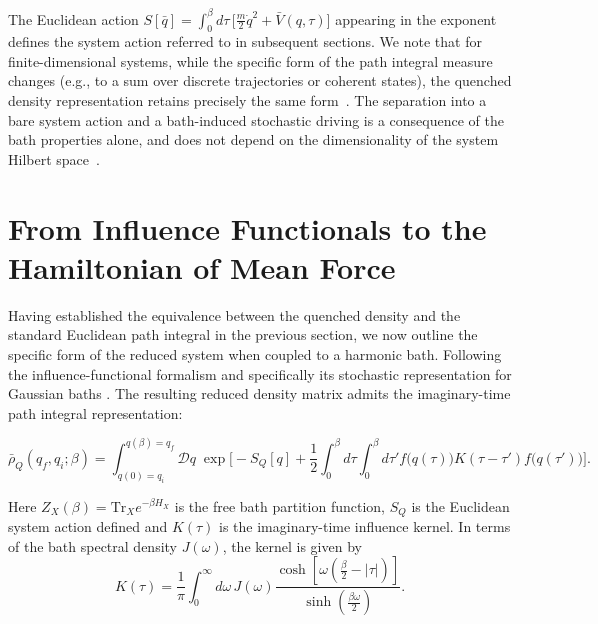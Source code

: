 \documentclass[aps,prl,twocolumn,superscriptaddress,showpacs,floatfix]{revtex4-2}
\newcommand{\Tr}{\mathrm{Tr}}
\begin{document}
The Euclidean action $S[\bar q]=\int_0^\beta d\tau\,\big[\frac{m}{2}\dot q^2+\bar V(q,\tau)\big]$
appearing in the exponent defines the system action referred to in subsequent
sections. We note that for finite-dimensional systems, while the specific form of the path integral measure changes (e.g., to a sum over discrete trajectories or coherent states), the quenched density representation retains precisely the same form~\cite{weissQuantumDissipativeSystems2012, altlandCondensedMatterField2010}. The separation into a bare system action and a bath-induced stochastic driving is a consequence of the bath properties alone, and does not depend on the dimensionality of the system Hilbert space~\cite{leggettDynamicsDissipativeTwostate1987}.
 \section{\label{sec:influence_to_hmf}From Influence Functionals to the Hamiltonian of Mean Force}
Having established the equivalence between the quenched density and the standard Euclidean path integral in the previous section, we now outline the specific form of the reduced system when coupled to a harmonic bath. Following the influence-functional formalism \cite{feynmanTheoryGeneralQuantum1963a,caldeiraQuantumTunnellingDissipative1983a,grabertQuantumBrownianMotion1988} and specifically its stochastic representation for Gaussian baths \cite{mccaulPartitionfreeApproachOpen2017c, mccaulDrivingSpinbosonModels2018a, mccaulHowWinFriends2021b}. The resulting reduced density matrix admits the imaginary-time path integral representation:
\begin{widetext}
\begin{equation}
    \bar\rho_Q(q_f,q_i;\beta) = \int_{q(0)=q_i}^{q(\beta)=q_f}\!\!\mathcal D q\; \exp\Bigg[ -S_Q[q] + \frac{1}{2}\int_0^\beta d\tau\int_0^\beta d\tau' f\big(q(\tau)\big) K(\tau-\tau') f\big(q(\tau')\big) \Bigg].
    \label{eq:reduced_effective_PI}
\end{equation}
\end{widetext}
Here $Z_X(\beta)=\Tr_X e^{-\beta H_X}$ is the free bath partition function, $S_Q$ is the Euclidean system action defined and $K(\tau)$ is the imaginary-time influence kernel. In terms of the bath spectral density $J(\omega)$, the kernel is given by~\cite{weissQuantumDissipativeSystems2012, feynmanTheoryGeneralQuantum1963a}
\begin{equation}
    K(\tau) = \frac{1}{\pi}\int_0^\infty d\omega\, J(\omega) \frac{\cosh\!\left[\omega\left(\frac{\beta}{2}-|\tau|\right)\right]} {\sinh\!\left(\frac{\beta\omega}{2}\right)}.
    \label{eq:kernel_spectral}
\end{equation}
\end{document}
